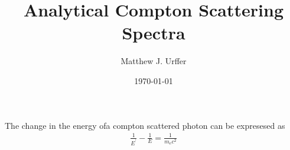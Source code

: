 \documentclass[draftcls,onecolumn]{IEEEtran}
\begin{document}
\title{Analytical Compton Scattering Spectra}
\author{Matthew J. Urffer}
\date{\today}
\maketitle

\printnomenclature

\listoftodos
\tableofcontents
\listoffigures
\listoftables
\lstlistoflistings

The change in the energy ofa compton scattered photon can be expresesed as
\begin{align}
  \frac{1}{E^'} -\frac{1}{E} = \frac{1}{m_e c^2}%
\end{align}
\end{document}
